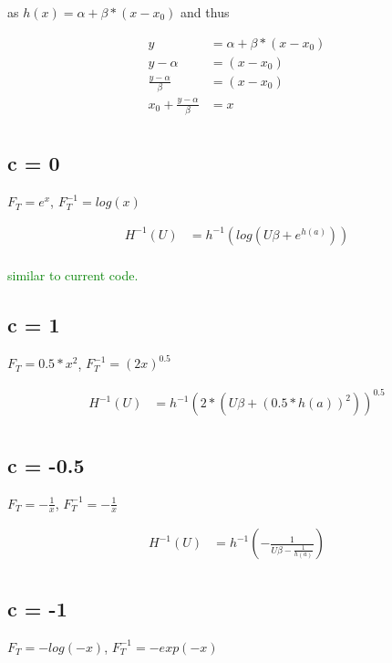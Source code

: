\documentclass[]{article}
\begin{document}
as $h(x) = \alpha + \beta * (x - x_0)$ and thus 

\begin{align*}
y &= \alpha + \beta * (x - x_0) \\
y - \alpha &= (x - x_0) \\
\frac{y - \alpha}{\beta} &=  (x - x_0) \\
x_0 + \frac{y - \alpha}{\beta} &=  x \\
\end{align*}

\subsection{c = 0}

$F_T = e^x$, $F_T^{-1} = log(x)$

\begin{align*}
H^{-1}(U) &= h^{-1} \left( log \left( U\beta + e^{h(a)} \right) \right) \\
\end{align*}

\textcolor{green}{similar to current code.}

\subsection{c = 1}

$F_T = 0.5 * x^2$, $F_T^{-1} = (2x)^{0.5}$

\begin{align*}
H^{-1}(U) &= h^{-1} \left( 2 * \left( U\beta + (0.5 *h(a))^{2} \right) \right)^{0.5} \\
\end{align*}

\subsection{c = -0.5}

$F_T = -\frac{1}{x}$, $F_T^{-1} = - \frac{1}{x}$

\begin{align*}
H^{-1}(U) &= h^{-1} \left( - \frac{1}{U\beta - \frac{1}{h(a)}} \right) \\
\end{align*}


\subsection{c = -1}

$F_T =-log(-x)$, $F_T^{-1} = -exp(-x)$
\end{document}
